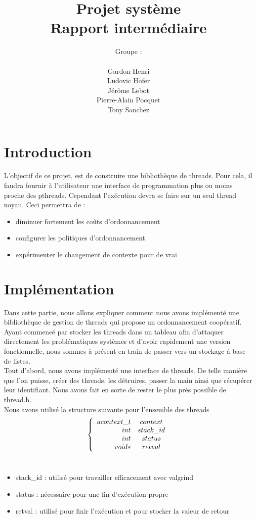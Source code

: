 \documentclass{article}
\author{Groupe :\\ \\Gardon Henri\\Ludovic Hofer\\Jérôme Lebot\\Pierre-Alain Pocquet\\Tony Sanchez}
\title{Projet système \\ Rapport intermédiaire}
\begin{document}
\maketitle

\newpage

\section*{Introduction}
 
 L'objectif de ce projet, est de construire une bibliothèque de threads. Pour
cela, il faudra fournir à l'utilisateur une interface de programmation plus ou
moins proche des pthreads.
 Cependant l'exécution devra se faire sur un seul thread noyau.
 Ceci permettra de :
 \\
 \begin{itemize}
 \item diminuer fortement les coûts d'ordonnancement
 \item configurer les politiques d'ordonnancement
 \item expérimenter le changement de contexte pour de vrai
 \end{itemize}

\section{Implémentation}
 
 	Dans cette partie, nous allons expliquer comment nous avons implémenté une
bibliothèque de gestion de threads qui propose un ordonnancement coopératif.
Ayant commencé par stocker les threads dans un tableau afin d'attaquer directement
les problématiques systèmes et d'avoir rapidement une version fonctionnelle, nous
sommes à présent en train de passer vers un stockage à base de listes.
 \\
	Tout d'abord, nous avons implémenté une interface de threads. De telle manière
que l'on puisse, créer des threads, les détruires, passer la main ainsi que
récupérer leur identifiant. Nous avons fait en sorte de rester le plus près
possible de thread.h.
\\
Nous avons utilisé la structure suivante pour l'ensemble des threads
\\
\[
\left\{
\begin{array}{r c }
ucontext\_t &context\\
int &stack\_id\\
int & status\\
void* & retval
\end{array}
\right.
\]
\\
\begin{itemize}
\item stack\_id : utilisé pour travailler efficacement avec valgrind
\item status : nécessaire pour une fin d'exécution propre
\item retval : utilisé pour finir l'exécution et pour stocker la valeur de
  retour
\end{itemize}
\end{document}
